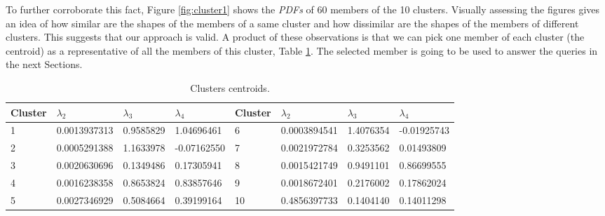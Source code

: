 \documentclass[11pt]{article}
\begin{document}
To further corroborate this fact, Figure \ref{fig:cluster1} shows the \textit{PDFs} of 60 members of the 10 clusters. Visually assessing the figures gives an idea of how similar are the shapes of the members of a same cluster and how dissimilar are the shapes of the  members of different clusters. This suggests that our approach is valid. A product of these observations is that we can pick one member of each cluster (the centroid) as a representative of all the members of this cluster, Table \ref{tab:center_of_the_clusters}. The selected member is going to be used to answer the queries in the next Sections.
\begin{table}[ht]
\begin{center}
    \begin{tabular}{|l|l|l|l|l|l|l||l|}
    \hline
    \textbf{Cluster} & $\lambda_{2}$ & $\lambda_{3}$ & $\lambda_{4}$ & \textbf{Cluster} & $\lambda_{2}$ & $\lambda_{3}$ & $\lambda_{4}$  \\ \hline
    1     & 0.0013937313 & 0.9585829 & 1.04696461   &   6 & 0.0003894541 & 1.4076354 & -0.01925743 \\ \hline
    2     & 0.0005291388 & 1.1633978 & -0.07162550  &  7 & 0.0021972784 & 0.3253562 & 0.01493809 \\ \hline
    3     & 0.0020630696 & 0.1349486 & 0.17305941   &  8 & 0.0015421749 & 0.9491101 & 0.86699555 \\ \hline
    4     &  0.0016238358 & 0.8653824 & 0.83857646  &  9  & 0.0018672401 & 0.2176002 & 0.17862024  \\ \hline
    5     & 0.0027346929 & 0.5084664 & 0.39199164  &  10   & 0.4856397733 & 0.1404140 & 0.14011298  \\ \hline
    \end{tabular}
 \caption {Clusters centroids.}
 \label{tab:center_of_the_clusters}
 \end{center}
\end{table}
\end{document}
